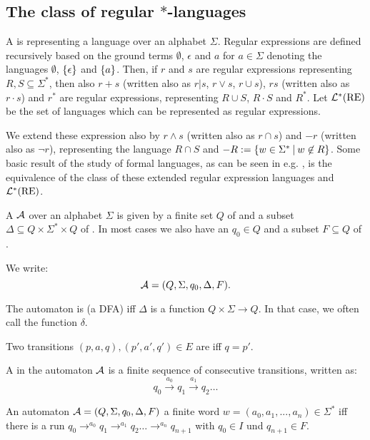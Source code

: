 \subsection{The class of regular $*$-languages}

A  is representing a language over an alphabet $\Sigma$. Regular expressions are defined recursively based on the ground terms $\emptyset$, $\epsilon$ and $a$ for $a \in \Sigma$ denoting the languages $\emptyset$, $\Set{\epsilon}$ and $\Set{a}$. Then, if $r$ and $s$ are regular expressions representing $R, S \subseteq \Sigma^*$, then also $r+s$ (written also as $r|s$, $r \vee s$, $r \cup s$), $r s$ (written also as $r \cdot s$) and $r^*$ are regular expressions, representing $R \cup S$, $R \cdot S$ and $R^*$. Let $\mathcal{L}^*(\text{RE})$ be the set of languages which can be represented as regular expressions.

We extend these expression also by $r \wedge s$ (written also as $r \cap s$) and $-r$ (written also as $\neg r$), representing the language $R \cap S$ and $-R := \Set{w \in \Sigma^*}{w \not\in R}$. Some basic result of the study of formal languages, as can be seen in e.g. \cite{FinAutLogR109}, is the equivalence of the class of these extended regular expression languages and $\mathcal{L}^*(\text{RE})$.

A   $\mathcal{A}$ over an alphabet $\Sigma$ is given by a finite set $Q$ of  and a subset $\Delta \subseteq Q \times \Sigma^* \times Q$ of . In most cases we also have an  $q_0 \in Q$ and a subset $F \subseteq Q$ of .

We write:
\[ \mathcal{A} = (Q, \Sigma, q_0, \Delta, F). \]

The automaton is  (a DFA) iff $\Delta$ is a function $Q \times \Sigma \rightarrow Q$. In that case, we often call the function $\delta$.

Two transitions $(p,a,q), (p',a',q') \in E$ are  iff $q=p'$.

A  in the automaton $\mathcal{A}$ is a finite sequence of consecutive transitions, written as:
\[ q_0 \xrightarrow{a_0} q_1 \xrightarrow{a_1} q_2 \dots \]

An automaton $\mathcal{A} = (Q, \Sigma, q_0, \Delta, F)$  a finite word $w = (a_0,a_1,...,a_n) \in \Sigma^*$ iff there is a run $q_0 \rightarrow^{a_0} q_1 \rightarrow^{a_1} q_2 \dots \rightarrow^{a_n} q_{n+1}$ with $q_0 \in I$ und $q_{n+1} \in F$.


